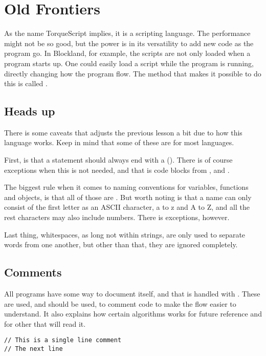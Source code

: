 \section{Old Frontiers}

As the name TorqueScript implies, it is a scripting language. The performance might not be so good, but the power is in its versatility to add new code as the program go. In Blockland, for example, the scripts are not only loaded when a program starts up. One could easily load a script while the program is running, directly changing how the program flow. The method that makes it possible to do this is called .

\subsection{Heads up}

There is some caveats that adjusts the previous lesson a bit due to how this language works. Keep in mind that some of these are for most languages.

First, is that a statement should always end with a  (\code{;}). There is of course exceptions when this is not needed, and that is code blocks from ,  and .

The biggest rule when it comes to naming conventions for variables, functions and objects, is that all of those are . But worth noting is that a name can only consist of the first letter as an ASCII character, a to z and A to Z, and all the rest characters may also include numbers. There is exceptions, however.

Last thing, whitespaces, as long not within strings, are only used to separate words from one another, but other than that, they are ignored completely.

\subsection{Comments}

All programs have some way to document itself, and that is handled with . These are used, and should be used, to comment code to make the flow easier to understand. It also explains how certain algorithms works for future reference and for other that will read it.

\begin{lstlisting}[style=ts]
// This is a single line comment
// The next line
\end{lstlisting}

